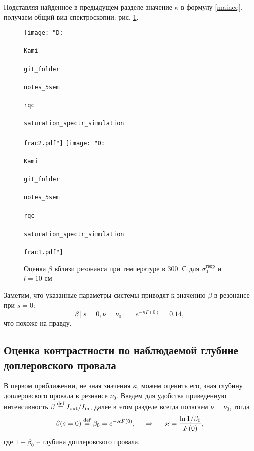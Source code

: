 Подставляя найденное в предыдущем разделе значение $\kappa$ в формулу \eqref{maineq}, получаем общий вид спектроскопии: рис. \ref{fig:frac12}.

\begin{figure}[h]
    \centering
    \texttt{[image: "D:\\\\Kami\\\\git\_folder\\\\notes\_5sem\\\\rqc\\\\saturation\_spectr\_simulation\\\\frac2.pdf"]}
    \hspace{5 mm} 
    \texttt{[image: "D:\\\\Kami\\\\git\_folder\\\\notes\_5sem\\\\rqc\\\\saturation\_spectr\_simulation\\\\frac1.pdf"]}
    \caption{Оценка $\beta$ вблизи резонанса при температуре в $300\ {}^{\circ}$С для $\sigma_0^{\text{теор}}$ и $l = 10$ см}
    \label{fig:frac12}
\end{figure}


Заметим, что указанные параметры системы приводят к значению $\beta$ в резонансе при $s=0$:
\begin{equation*}
    \beta[s=0, \nu=\nu_0] = e^{- \kappa F(0)} = 0.14,
\end{equation*}
что похоже на правду.





\newpage

\subsection{Оценка контрастности по наблюдаемой глубине доплеровского провала}

В первом приближении, не зная значения $\kappa$, можем оценить его, зная глубину доплеровского провала в резнансе $\nu_0$. Введем для удобства приведенную интенсивность $\beta \overset{\mathrm{def}}{=}  \sub{I}{out}/\sub{I}{in}$, далее в этом разделе всегда полагаем $\nu = \nu_0$, тогда
\begin{equation*}
    \beta(s=0) \overset{\mathrm{def}}{=}  \beta_0 = e^{- \kappa F(0)},
    \hspace{0.5cm} \Rightarrow \hspace{0.5cm}
    \kappa = \frac{\ln 1/\beta_0}{F(0)},
\end{equation*}
где $1-\beta_0$ -- глубина доплеровского провала.

